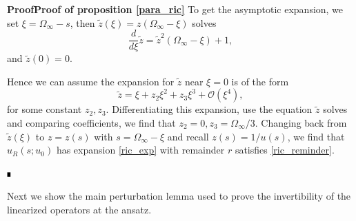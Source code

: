 \documentclass[letterpaper,11pt]{article}
\newcommand{\rmO}{\mathcal{O}}
\numberwithin{equation}{section}
\theoremstyle{plain}
\newenvironment{Proof}[1][.]%
 {\begin{trivlist}\item[]\textbf{Proof#1 }}%
 {\hspace*{\fill}$\rule{0.3\baselineskip}{0.35\baselineskip}$\end{trivlist}}
\begin{document}
\begin{Proof}[\textbf{Proof of proposition \ref{para_ric}}]
To get the asymptotic expansion, we set $\xi = \Omega_\infty-s$, then $\tilde{z}(\xi)=z(\Omega_\infty-\xi)$ solves
\[
\frac{d}{d\xi} \tilde{z} = \tilde{z}^2(\Omega_\infty-\xi)+1,
\]
and $\tilde{z}(0) = 0$.

Hence we can assume the expansion for $\tilde{z}$ near $\xi=0$ is of the form
\[
\tilde{z} = \xi + z_2\xi^2+z_3\xi^3 + \rmO(\xi^4),
\]
for some constant $z_2,z_3$. Differentiating this expansion, use the equation $\tilde{z}$ solves and comparing coefficients, we find that $z_2 = 0, z_3 = \Omega_\infty/3$.  Changing back from $\tilde{z}(\xi)$ to $z=z(s)$ with $s = \Omega_\infty-\xi$ and recall $z(s) = 1/u(s)$, we find that $u_R(s;u_0)$ has expansion \eqref{ric_exp} with remainder $r$ satisfies \eqref{ric_reminder}.


\end{Proof}

Next we show the main perturbation lemma used to prove the invertibility of the linearized operators at the ansatz.
\end{document}
